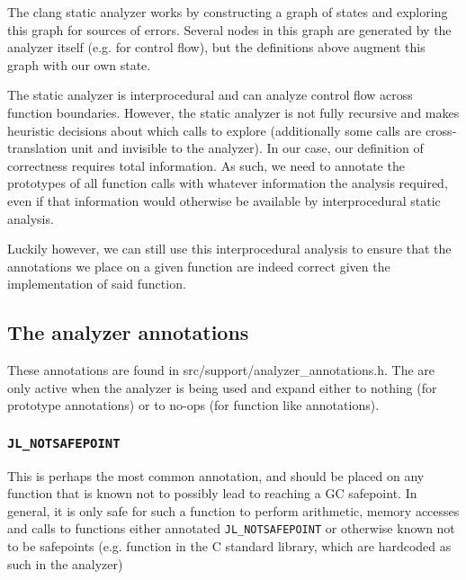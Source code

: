 The clang static analyzer works by constructing a graph of states and exploring this graph for sources of errors. Several nodes in this graph are generated by the analyzer itself (e.g. for control flow), but the definitions above augment this graph with our own state.



The static analyzer is interprocedural and can analyze control flow across function boundaries. However, the static analyzer is not fully recursive and makes heuristic decisions about which calls to explore (additionally some calls are cross-translation unit and invisible to the analyzer). In our case, our definition of correctness requires total information. As such, we need to annotate the prototypes of all function calls with whatever information the analysis required, even if that information would otherwise be available by interprocedural static analysis.



Luckily however, we can still use this interprocedural analysis to ensure that the annotations we place on a given function are indeed correct given the implementation of said function.



\hypertarget{5382015011410468170}{}


\subsection{The analyzer annotations}



These annotations are found in src/support/analyzer\_annotations.h. The are only active when the analyzer is being used and expand either to nothing (for prototype annotations) or to no-ops (for function like annotations).



\hypertarget{4716575215472782777}{}


\subsubsection{\texttt{JL\_NOTSAFEPOINT}}



This is perhaps the most common annotation, and should be placed on any function that is known not to possibly lead to reaching a GC safepoint. In general, it is only safe for such a function to perform arithmetic, memory accesses and calls to functions either annotated \texttt{JL\_NOTSAFEPOINT} or otherwise known not to be safepoints (e.g. function in the C standard library, which are hardcoded as such in the analyzer)



